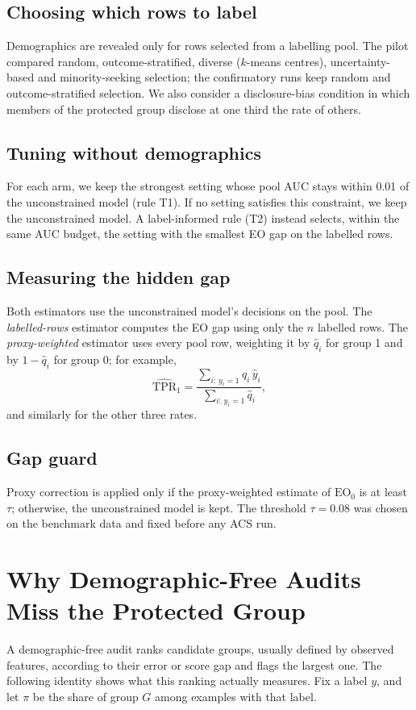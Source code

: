 \documentclass[conference]{IEEEtran}
\newcommand{\EO}{\mathrm{EO}}
\newcommand{\TPR}{\mathrm{TPR}}
\begin{document}
\subsection{Choosing which rows to label}
Demographics are revealed only for rows selected from a labelling pool. The pilot compared random, outcome-stratified, diverse ($k$-means centres), uncertainty-based and minority-seeking selection; the confirmatory runs keep random and outcome-stratified selection. We also consider a disclosure-bias condition in which members of the protected group disclose at one third the rate of others.

\subsection{Tuning without demographics}
For each arm, we keep the strongest setting whose pool AUC stays within 0.01 of the unconstrained model (rule T1). If no setting satisfies this constraint, we keep the unconstrained model. A label-informed rule (T2) instead selects, within the same AUC budget, the setting with the smallest EO gap on the labelled rows.

\subsection{Measuring the hidden gap}
Both estimators use the unconstrained model's decisions on the pool. The \emph{labelled-rows} estimator computes the EO gap using only the $n$ labelled rows. The \emph{proxy-weighted} estimator uses every pool row, weighting it by $\hat q_i$ for group 1 and by $1-\hat q_i$ for group 0; for example,
\begin{equation}
\widehat{\TPR}_1=\frac{\sum_{i:\,y_i=1}\hat q_i\,\hat y_i}{\sum_{i:\,y_i=1}\hat q_i},
\end{equation}
and similarly for the other three rates.

\subsection{Gap guard}
Proxy correction is applied only if the proxy-weighted estimate of $\EO_0$ is at least $\tau$; otherwise, the unconstrained model is kept. The threshold $\tau=0.08$ was chosen on the benchmark data and fixed before any ACS run.

\section{Why Demographic-Free Audits Miss the Protected Group}\label{sec:audit}
A demographic-free audit ranks candidate groups, usually defined by observed features, according to their error or score gap and flags the largest one. The following identity shows what this ranking actually measures. Fix a label $y$, and let $\pi$ be the share of group $G$ among examples with that label.
\end{document}
